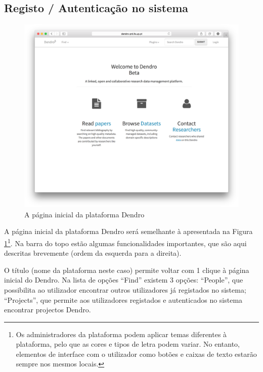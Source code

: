 \documentclass[paper=a4, fontsize=11pt]{scrartcl} %
\numberwithin{equation}{section} %
\numberwithin{figure}{section} %
\numberwithin{table}{section} %
\begin{document}

\subsection{Registo / Autenticação no sistema}

\begin{figure}[h!t!]
	\centering
	\includegraphics[width=\textwidth]{Images/homepage}
	\caption{A página inicial da plataforma Dendro}
	\label{fig:homepage}
\end{figure}

A página inicial da plataforma Dendro será semelhante à apresentada na Figura \ref{fig:homepage}\footnote{Os administradores da plataforma podem aplicar temas diferentes à plataforma, pelo que as cores e tipos de letra podem variar. No entanto, elementos de interface com o utilizador como botões e caixas de texto estarão sempre nos mesmos locais.}. Na barra do topo estão algumas funcionalidades importantes, que são aqui descritas brevemente (ordem da esquerda para a direita).

O título (nome da plataforma neste caso) permite voltar com 1 clique à página inicial do Dendro. Na lista de opções ``Find'' existem 3 opções: ``People'', que possibilita ao utilizador encontrar outros utilizadores já registados no sistema; ``Projects'', que permite aos utilizadores registados e autenticados no sistema encontrar projectos Dendro.
\end{document}
